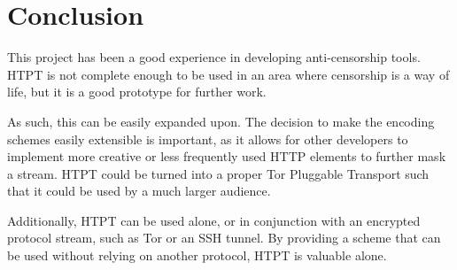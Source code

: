\section{Conclusion}

This project has been a good experience in developing anti-censorship tools. HTPT is not complete enough to be used in an area where censorship is a way of life, but it is a good prototype for further work. 

As such, this can be easily expanded upon. The decision to make the encoding schemes easily extensible is important, as it allows for other developers to implement more creative or less frequently used HTTP elements to further mask a stream. HTPT could be turned into a proper Tor Pluggable Transport such that it could be used by a much larger audience.

Additionally, HTPT can be used alone, or in conjunction with an encrypted protocol stream, such as Tor or an SSH tunnel. By providing a scheme that can be used without relying on another protocol, HTPT is valuable alone. 